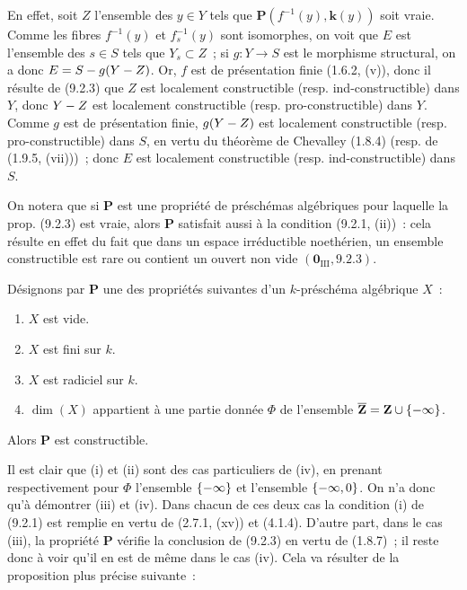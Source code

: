 En effet, soit $Z$ l'ensemble des $y\in Y$ tels que
$\boldsymbol{P}(f^{-1}(y),\boldsymbol{k}(y))$ soit vraie. Comme les fibres $f^{-1}(y)$ et
$f_s^{-1}(y)$ sont isomorphes, on voit que $E$ est l'ensemble des $s\in S$
tels que $Y_s\subset Z$~; si $g:Y\to S$ est le morphisme structural, on a
donc $E=S- g(Y- Z)$.
Or, $f$ est de présentation finie (1.6.2, (v)), donc il résulte de (9.2.3) que
$Z$ est localement constructible (resp. ind-constructible) dans $Y$, donc
$Y- Z$ est localement constructible (resp. pro-constructible) dans $Y$. Comme
$g$ est de présentation finie, $g(Y- Z)$ est localement constructible
(resp. pro-constructible) dans $S$, en vertu du théorème de Chevalley (1.8.4)
(resp. de (1.9.5, (vii)))~; donc $E$ est localement constructible
(resp. ind-constructible) dans $S$.

\begin{remark}[9.2.5]
\label{IV.9.2.5-fr}
On notera que si $\boldsymbol{P}$ est une propriété de préschémas algébriques pour
laquelle la prop. (9.2.3) est vraie, alors $\boldsymbol{P}$ satisfait aussi à la
condition (9.2.1, (ii))~: cela résulte en effet du fait que dans un espace
irréductible noethérien, un ensemble constructible est rare ou contient un
ouvert non vide $(\mathbf 0_{\mathrm{III}},9.2.3)$.
\end{remark}

\begin{proposition}[9.2.6]
\label{IV.9.2.6-fr}
Désignons par $\boldsymbol{P}$ une des propriétés suivantes d'un $k$-préschéma
algébrique $X$~:
\begin{enumerate}[label=\textup{(\roman*)}]
  \item $X$ est vide.
  \item $X$ est fini sur $k$.
  \item $X$ est radiciel sur $k$.
  \item $\dim(X)$ appartient à une partie donnée $\Phi$ de l'ensemble
  $\overline{\mathbf Z}=\mathbf Z\cup\{-\infty\}$.
\end{enumerate}

Alors $\boldsymbol{P}$ est constructible.
\end{proposition}

Il est clair que (i) et (ii) sont des cas particuliers de (iv), en prenant
respectivement pour $\Phi$ l'ensemble $\{-\infty\}$ et l'ensemble
$\{-\infty,0\}$. On n'a donc qu'à démontrer (iii) et (iv). Dans chacun de ces
deux cas la condition (i) de (9.2.1) est remplie en vertu de (2.7.1, (xv)) et
(4.1.4). D'autre part, dans le cas (iii), la propriété $\boldsymbol{P}$ vérifie la
conclusion de (9.2.3) en vertu de (1.8.7)~; il reste donc à voir qu'il en est de
même dans le cas (iv). Cela va résulter de la proposition plus précise
suivante~:

